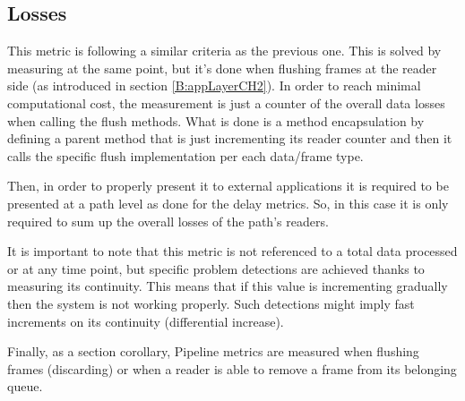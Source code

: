 \subsection{Losses}

This metric is following a similar criteria as the previous one. This is solved by measuring at the same point, but it's done when flushing frames at the reader side (as introduced in section \ref{B:appLayerCH2}). In order to reach minimal computational cost, the measurement is just a counter of the overall data losses when calling the flush methods. What is done is a method encapsulation by defining a parent method that is just incrementing its reader counter and then it calls the specific flush implementation per each data/frame type.

Then, in order to properly present it to external applications it is required to be presented at a path level as done for the delay metrics. So, in this case it is only required to sum up the overall losses of the path's readers.

It is important to note that this metric is not referenced to a total data processed or at any time point, but specific problem detections are achieved thanks to measuring its continuity. This means that if this value is incrementing gradually then the system is not working properly. Such detections might imply fast increments on its continuity (differential increase). 


Finally, as a section corollary, Pipeline metrics are measured when flushing frames (discarding) or when a reader is able to remove a frame from its belonging queue. 
